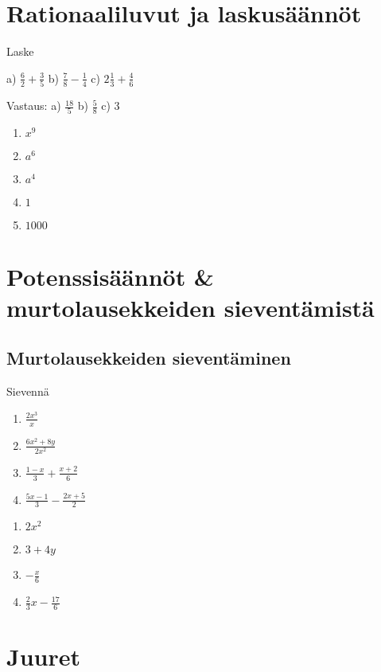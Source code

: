 \chapter{Rationaaliluvut ja laskusäännöt}

Laske %
\begin{tehtava}
a) $\frac{6}{2} + \frac{3}{5}$
b) $\frac{7}{8} - \frac{1}{4}$
c) $2 \frac{1}{3} + \frac{4}{6}$
\begin{vastaus}
Vastaus:
a) $\frac{18}{5}$
b) $\frac{5}{8}$
c) $3$
\begin{enumerate}
\item $x^9$
\item $a^6$
\item $a^4$
\item $1$
\item $1000$
\end{enumerate}
\end{vastaus}
\end{tehtava}

\chapter{Potenssisäännöt \& murtolausekkeiden sieventämistä}

\section{Murtolausekkeiden sieventäminen}

\begin{tehtava}
Sievennä
\begin{enumerate}
\item $\frac{2x^3}{x}$
\item $\frac{6x^2+8y}{2x^2}$
\item $ \frac{1-x}{3} + \frac{x+2}{6}$
\item $ \frac{5x-1}{3} - \frac{2x+5}{2}$
\end{enumerate}
\begin{vastaus}
\begin{enumerate}
\item $2x^2$
\item $3+4y$
\item $ -\frac{x}{6}$
\item $ \frac{2}{3} x - \frac{17}{6}$
\end{enumerate}
\end{vastaus}
\end{tehtava}

\chapter{Juuret}

